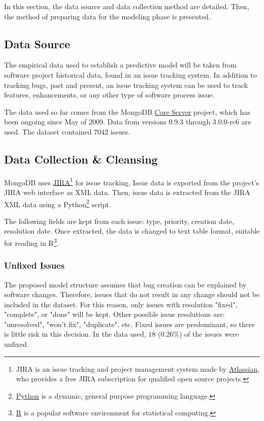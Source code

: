 \documentclass[a4paper]{scrartcl}
\begin{document}
In this section, the data source and data collection method are detailed. Then, the method of preparing data for the modeling phase is presented.

\subsection*{Data Source}
The empirical data used to establish a predictive model will be taken from software project historical data, found in an issue tracking system. In addition to tracking bugs, past and present, an issue tracking system can be used to track features, enhancements, or any other type of software process issue. 

The data used so far comes from the MongoDB \href{https://jira.mongodb.org/browse/SERVER}{Core Server} project, which has been ongoing since May of 2009. Data from versions 0.9.3 through 3.0.0-rc6 are used. The dataset contained $7042$ issues.

\subsection*{Data Collection \& Cleansing}
MongoDB uses \href{https://www.atlassian.com/software/jira}{JIRA}\footnote{JIRA is an issue tracking and project management system made by \href{https://www.atlassian.com/}{Atlassian}, who provides a free JIRA subscription for qualified open source projects.} for issue tracking. Issue data is exported from the project's JIRA web interface as XML data. Then, issue data is extracted from the JIRA XML data using a Python\footnote{\href{https://www.python.org/}{Python} is a dynamic, general purpose programming language.} script.

The following fields are kept from each issue: type, priority, creation date, resolution date.  Once extracted, the data is changed to text table format, suitable for reading in R\footnote{\href{http://www.r-project.org/}{R} is a popular software environment for statistical computing.}.

\subsubsection*{Unfixed Issues}
The proposed model structure assumes that bug creation can be explained by software changes. Therefore, issues that do not result in any change should not be included in the dataset. For this reason, only issues with resolution "fixed", "complete", or "done" will be kept. Other possible issue resolutions are: "unresolved", "won't fix", "duplicate", etc. Fixed issues are predominant, so there is little risk in this decision. In the data used, $18$ ($0.26\%$) of the issues were unfixed. 
\end{document}
